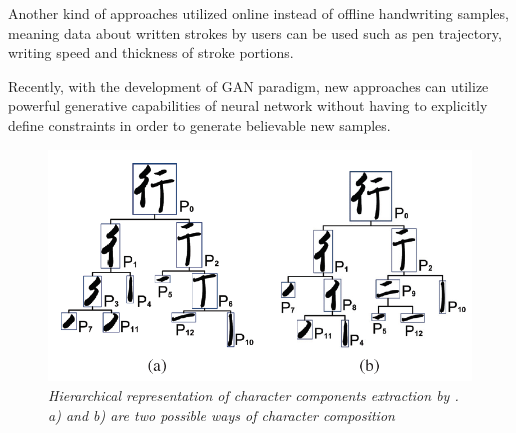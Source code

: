 \documentclass[12pt]{report}
\begin{document}
Another kind of approaches utilized online instead of offline handwriting samples, meaning data about written strokes by users can be used such as pen trajectory, writing speed and thickness of stroke portions.

Recently, with the development of GAN paradigm, new approaches can utilize powerful generative capabilities of neural network without having to explicitly define constraints in order to generate believable new samples.

\begin{figure}[h]
	\centering
	\includegraphics[scale=0.7]{hierarch-comp}
	\caption{\textit{Hierarchical representation of character components extraction by \cite{handwritten-font}. a) and b) are two possible ways of character composition}}
	\label{fig:hierarch-comp}
\end{figure}
\end{document}
